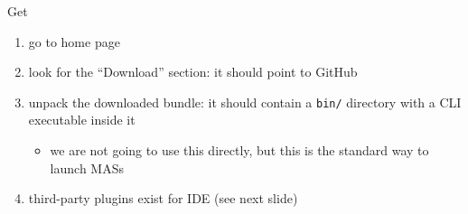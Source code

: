 \documentclass[presentation]{beamer}\mode<presentation>{\usetheme{AMSBolognaFC}}
\begin{document}
\begin{frame}[c, allowframebreaks]{Get \jason{}}
    \begin{enumerate}
        \item go to \jason{} home page
        \begin{center}
        \end{center}
    
        \bigskip
    
        \item look for the ``Download'' section: it should point to GitHub
        \begin{center}
        \end{center}
        
        \bigskip

        \item unpack the downloaded bundle: it should contain a \texttt{bin/} directory with a CLI executable inside it
        \begin{itemize}
            \item we are not going to use this directly, but this is the standard way to launch \jason{} MASs
        \end{itemize}

        \item third-party plugins exist for IDE (see next slide)
        

        
        
        
        
        
        
    \end{enumerate}
        
\end{frame}
\end{document}
